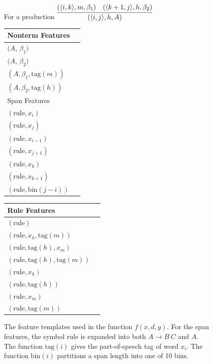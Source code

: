 \documentclass[11pt,letterpaper]{article}
\newcommand{\Span}[1]{\langle #1 \rangle}
\newcommand{\RuleSym}{\mathrm{rule}}
\newcommand{\Rule}[3]{#1 \rightarrow #2\ #3}
\newcommand{\BinFN}[1]{\mathrm{bin}({#1})}
\newcommand{\TagFN}[1]{\mathrm{tag}({#1})}
\newcommand{\WordFN}[1]{x_{#1}}
\begin{document}
\begin{figure}
  \footnotesize
  \centering
  For a production $ \infer{(\Span{i, j}, h, A)}{(\Span{i, k}, m, \beta_1) &  (\Span{k+1, j}, h, \beta_2)} $

  \vspace{0.5cm}

  \begin{multicols}{2}

  \begin{tabular}{|l|l}

  \hline
  Nonterm Features \\
  \hline

  \hline
  $(A$, $\beta_1)$ \\
  $(A$, $\beta_2)$ \\
  $(A, \beta_1, \TagFN{m})$ \\
  $(A, \beta_2, \TagFN{h})$ \\
  \hline
    \hline
  Span Features \\
  \hline

  \hline
  $(\RuleSym, \WordFN{i})$\\
  $(\RuleSym, \WordFN{j})$\\
  $(\RuleSym, \WordFN{i-1})$\\
  $(\RuleSym, \WordFN{j+1})$\\
  $(\RuleSym, \WordFN{k})$\\
  $(\RuleSym, \WordFN{k+1})$\\
  $(\RuleSym, \BinFN{j-i})$\\
  \hline

  \end{tabular}

  \begin{tabular}{|l|l}

  \hline


  Rule Features \\
  \hline

  \hline

  $(\RuleSym  )$\\
  $(\RuleSym, \WordFN{h}, \TagFN{m})$ \\
  $(\RuleSym, \TagFN{h}, \WordFN{m})$ \\
  $(\RuleSym, \TagFN{h}, \TagFN{m})$ \\

  $(\RuleSym, \WordFN{h})$ \\
  $(\RuleSym, \TagFN{h})$ \\
  $(\RuleSym, \WordFN{m})$ \\
  $(\RuleSym, \TagFN{m})$ \\

  \hline

  \end{tabular}
  \end{multicols}
  \label{fig:features}
  \caption{The feature templates used in the function $f(x, d, y)$. For the span features, the symbol $\RuleSym$ is expanded into both $\Rule{A}{B}{C}$ and $A$. The function $\TagFN{i}$ gives the part-of-speech tag of word $x_i$. The function $\BinFN{i}$ partitions a span length into one of 10 bins.
  }
\end{figure}
\end{document}
